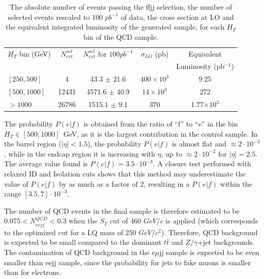 \documentclass{cmspaper}
\begin{document}
\begin{linenumbers}
\begin{table}[htbp]
\begin{center}
\begin{tabular}{|l|c|c|c|c|}
\hline\hline
 $H_T$ bin (GeV)   & $N_{evt}^{sel}$ & $N_{evt}^{sel}$ for $100pb^{-1}$ & $\sigma_{LO}$ (pb) & Equivalent           \\
                         &                 &                                  &                    & Luminosity (pb$^{-1}$) \\
\hline\hline
$[250,500]$              &  4              & 43.3    $\pm$ 21.6               & $400 \times 10^3$  &  9.25                \\
$[500,1000]$             &  12431          & 4571.6  $\pm$ 40.9               & $14 \times 10^3$   &  272                 \\
$>1000$                  &  26786          & 1515.1  $\pm$ 9.1                & $370$              &  1.77$\times 10^3$   \\
\hline\hline
\end{tabular}
\end{center}
\caption{\small The absolute number of events passing the ffjj selection, the number 
of selected events rescaled to 100 $pb^{-1}$ of data, the cross section at LO 
and the equivalent integrated luminosity of the generated sample, for each $H_T$ 
bin of the QCD sample.  }
\label{tab:ffjjSelection}
\end{table}


The probability $P(e|f)$ is obtained from the ratio of ``f'' to ``e'' in the bin  
$H_T\in[500,1000]$~GeV, as it is the largest contribution in the control sample.
In the barrel region ($|\eta|<1.5$), the probability $P(e|f)$ is almost flat and $\approx 2 \cdot 10^{-3}$,  
while in the endcap region it is increasing with $\eta$, up to $\approx 2 \cdot 10^{-2}$ 
for $|\eta|=2.5$. The average value found is $P(e|f) = 3.5 \cdot 10^{-3}$.
A closure test performed with relaxed ID and Isolation cuts shows 
that this method may underestimate the value of $P(e|f)$ by as much as a factor of 2,
resulting in a $P(e|f)$ within the range
$[3.5,7] \cdot 10^{-3}$.

The number of QCD events in the final sample is therefore estimated to be 
$0.075<N_{eejj}^{QCD}<0.3$ when the $S_T$ cut of 460 $GeV/c$ is applied 
(which corresponds to the optimized cut for a LQ mass of 250 $GeV/c^2$).
Therefore, QCD background is expected to be small compared to 
the dominant $t\bar{t}$ and $Z/\gamma$+jet backgrounds.
The contamination of QCD background in the e$\mu$jj sample 
is expected to be even smaller than eejj sample, since the probability for jets to fake muons 
is smaller than for electrons. %


\end{linenumbers}
\end{document}

